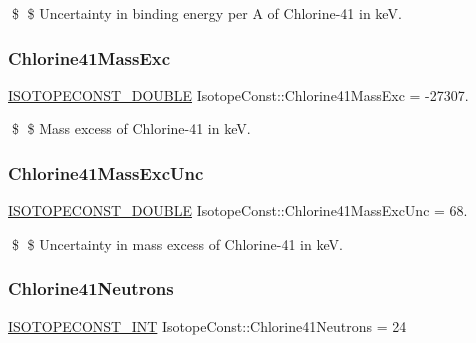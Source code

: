 \$ \$ Uncertainty in binding energy per A of Chlorine-\/41 in keV. \mbox{\label{group___isotope_const-_chlorine-_cl41_gaf1b0f44c4e4e93cafa1da3a05fecdd3c}} 
\subsubsection{\texorpdfstring{Chlorine41\+Mass\+Exc}{Chlorine41MassExc}}
{\footnotesize\ttfamily \mbox{\hyperlink{group___isotope_const-_macros_ga8f45a7272ce02c0b4c65c44636ed719a}{I\+S\+O\+T\+O\+P\+E\+C\+O\+N\+S\+T\+\_\+\+D\+O\+U\+B\+LE}} Isotope\+Const\+::\+Chlorine41\+Mass\+Exc = -\/27307.}

\$ \$ Mass excess of Chlorine-\/41 in keV. \mbox{\label{group___isotope_const-_chlorine-_cl41_ga3bc7e5528b9ab165e38c33a126a15d0a}} 
\subsubsection{\texorpdfstring{Chlorine41\+Mass\+Exc\+Unc}{Chlorine41MassExcUnc}}
{\footnotesize\ttfamily \mbox{\hyperlink{group___isotope_const-_macros_ga8f45a7272ce02c0b4c65c44636ed719a}{I\+S\+O\+T\+O\+P\+E\+C\+O\+N\+S\+T\+\_\+\+D\+O\+U\+B\+LE}} Isotope\+Const\+::\+Chlorine41\+Mass\+Exc\+Unc = 68.}

\$ \$ Uncertainty in mass excess of Chlorine-\/41 in keV. \mbox{\label{group___isotope_const-_chlorine-_cl41_ga86fe7f65ce8d27b42a7aa416a1ee713c}} 
\subsubsection{\texorpdfstring{Chlorine41\+Neutrons}{Chlorine41Neutrons}}
{\footnotesize\ttfamily \mbox{\hyperlink{group___isotope_const-_macros_ga5f18360b3e99483a35c32d789e62621c}{I\+S\+O\+T\+O\+P\+E\+C\+O\+N\+S\+T\+\_\+\+I\+NT}} Isotope\+Const\+::\+Chlorine41\+Neutrons = 24}


